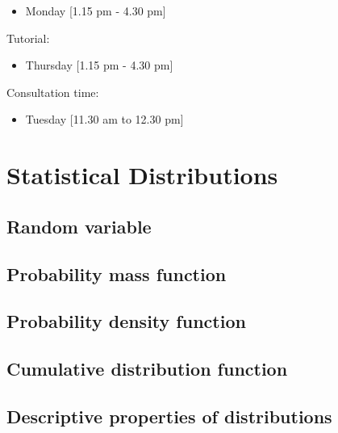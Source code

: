 \documentclass[]{book}
\providecommand{\tightlist}{%
  \setlength{\itemsep}{0pt}\setlength{\parskip}{0pt}}
\begin{document}
\begin{itemize}
\tightlist
\item
  Monday {[}1.15 pm - 4.30 pm{]}
\end{itemize}

Tutorial:

\begin{itemize}
\tightlist
\item
  Thursday {[}1.15 pm - 4.30 pm{]}
\end{itemize}

Consultation time:

\begin{itemize}
\tightlist
\item
  Tuesday {[}11.30 am to 12.30 pm{]}
\end{itemize}

\hypertarget{statistical-distributions}{%
\chapter{Statistical Distributions}\label{statistical-distributions}}


\hypertarget{random-variable}{%
\section{Random variable}\label{random-variable}}

\hypertarget{probability-mass-function}{%
\section{Probability mass function}\label{probability-mass-function}}

\hypertarget{probability-density-function}{%
\section{Probability density function}\label{probability-density-function}}

\hypertarget{cumulative-distribution-function}{%
\section{Cumulative distribution function}\label{cumulative-distribution-function}}

\hypertarget{descriptive-properties-of-distributions}{%
\section{Descriptive properties of distributions}\label{descriptive-properties-of-distributions}}
\end{document}

